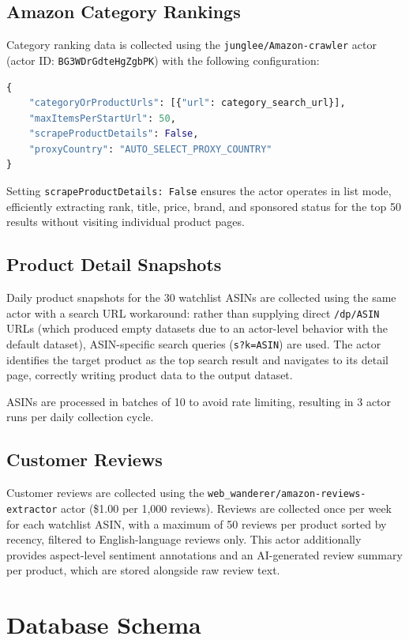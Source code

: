 \subsection{Amazon Category Rankings}
Category ranking data is collected using the \texttt{junglee/Amazon-crawler} actor
(actor ID: \texttt{BG3WDrGdteHgZgbPK}) with the following configuration:

\begin{lstlisting}[language=Python, caption=Category scraper configuration]
{
    "categoryOrProductUrls": [{"url": category_search_url}],
    "maxItemsPerStartUrl": 50,
    "scrapeProductDetails": False,
    "proxyCountry": "AUTO_SELECT_PROXY_COUNTRY"
}
\end{lstlisting}

Setting \texttt{scrapeProductDetails: False} ensures the actor operates in list mode,
efficiently extracting rank, title, price, brand, and sponsored status for the top 50
results without visiting individual product pages.

\subsection{Product Detail Snapshots}
Daily product snapshots for the 30 watchlist ASINs are collected using the same actor
with a search URL workaround: rather than supplying direct \texttt{/dp/ASIN} URLs
(which produced empty datasets due to an actor-level behavior with the default dataset),
ASIN-specific search queries (\texttt{s?k=ASIN}) are used. The actor identifies the
target product as the top search result and navigates to its detail page, correctly
writing product data to the output dataset.

ASINs are processed in batches of 10 to avoid rate limiting, resulting in 3 actor
runs per daily collection cycle.

\subsection{Customer Reviews}
Customer reviews are collected using the \texttt{web\_wanderer/amazon-reviews-extractor}
actor (\$1.00 per 1,000 reviews). Reviews are collected once per week for each
watchlist ASIN, with a maximum of 50 reviews per product sorted by recency, filtered
to English-language reviews only. This actor additionally provides aspect-level
sentiment annotations and an AI-generated review summary per product, which are
stored alongside raw review text.

\section{Database Schema}

